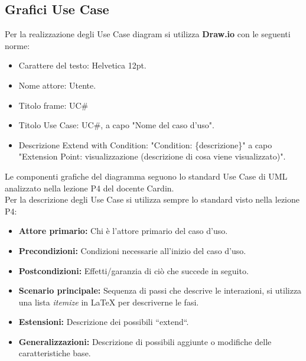 \subsection{Grafici Use Case}
Per la realizzazione degli Use Case diagram si utilizza \textbf{Draw.io} con le seguenti norme:
\begin{itemize}
\item Carattere del testo: Helvetica 12pt.
\item Nome attore: Utente.
\item Titolo frame: UC\#
\item Titolo Use Case: UC\#, a capo "Nome del caso d'uso".
\item Descrizione Extend with Condition: "Condition: \{descrizione\}" a capo "Extension Point: visualizzazione (descrizione di cosa viene visualizzato)".
\end{itemize}
Le componenti grafiche del diagramma seguono lo standard Use Case di UML analizzato nella lezione P4 del docente Cardin. \\

\noindent Per la descrizione degli Use Case si utilizza sempre lo standard visto nella lezione P4:
\begin{itemize}
	\item \textbf{Attore primario:} Chi è l'attore primario del caso d'uso.
	\item \textbf{Precondizioni:} Condizioni necessarie all'inizio del caso d'uso.
	\item \textbf{Postcondizioni:} Effetti/garanzia di ciò che succede in seguito.
	\item \textbf{Scenario principale:} Sequenza di passi che descrive le interazioni, si utilizza una lista \textit{itemize} in LaTeX per descriverne le fasi.
	\item \textbf{Estensioni:} Descrizione dei possibili ``extend``.
	\item \textbf{Generalizzazioni:} Descrizione di possibili aggiunte o modifiche delle caratteristiche base.
\end{itemize}


